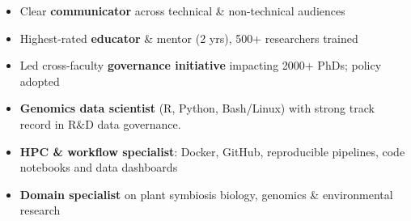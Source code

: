 \documentclass[a4paper,10pt]{article}
\begin{document}
{\begin{adjustbox}{valign=t}
\begin{minipage}[t]{0.3\textwidth}
{
\begin{spacing}{1}
\begin{itemize}
  \setlength{\itemindent}{-1em}
  \setlength{\itemsep}{0.0em}
  \item Clear \textbf{communicator} across technical \& non-technical audiences
  \item Highest-rated \textbf{educator} \& mentor (2 yrs), 500+ researchers trained
  \item Led cross-faculty \textbf{governance initiative} impacting 2000+ PhDs; policy adopted
  \item \textbf{Genomics data scientist} (R, Python, Bash/Linux) with strong track record in R\&D data governance.
  \item \textbf{HPC \& workflow specialist}: Docker, GitHub, reproducible pipelines, code notebooks and data dashboards
  \item \textbf{Domain specialist} on plant symbiosis biology, genomics \& environmental research
\end{itemize}
\end{spacing}
}




\end{minipage}%
\end{adjustbox}%
\hfill%


\begin{adjustbox}{valign=t}
\hfill%
\begin{minipage}[t]{0.05\textwidth}
\MyVerticalRule
\end{minipage}%
\end{adjustbox}

\begin{adjustbox}{valign=t}
\hfill%
\begin{minipage}[t]{0.6\textwidth}



\end{minipage}
\end{adjustbox}}
\end{document}
